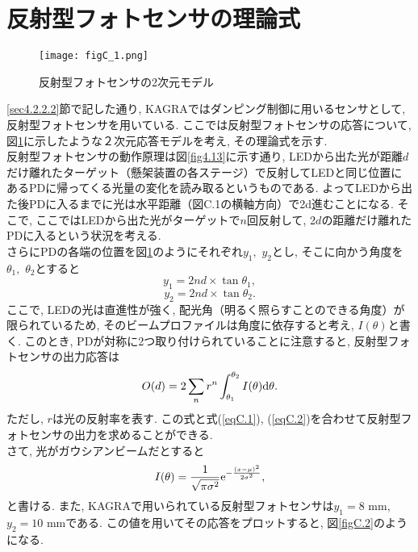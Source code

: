 \section{反射型フォトセンサの理論式}
\begin{figure}[H]
\begin{center}
\texttt{[image: figC\_1.png]}
\caption[反射型フォトセンサの2次元モデル]{反射型フォトセンサの2次元モデル}
\label{figC.1}
\end{center}
\end{figure}
\ref{sec4.2.2.2}節で記した通り, KAGRAではダンピング制御に用いるセンサとして, 反射型フォトセンサを用いている. ここでは反射型フォトセンサの応答について, 図\ref{figC.1}に示したような２次元応答モデルを考え, その理論式を示す. \\
\quad 反射型フォトセンサの動作原理は図\ref{fig4.13}に示す通り, LEDから出た光が距離$d$だけ離れたターゲット（懸架装置の各ステージ）で反射してLEDと同じ位置にあるPDに帰ってくる光量の変化を読み取るというものである. よってLEDから出た後PDに入るまでに光は水平距離（図C.1の横軸方向）で2d進むことになる. そこで, ここではLEDから出た光がターゲットで$n$回反射して, 2$d$の距離だけ離れたPDに入るという状況を考える. \\
\quad さらにPDの各端の位置を図\ref{figC.1}のようにそれぞれ$y_1,\,\,y_2$とし, そこに向かう角度を$\theta_1,\,\,\theta_2$とすると
\begin{equation}
y_1=2nd\times\tan\theta_1,
\label{eqC.1}
\end{equation}
\begin{equation}
y_2=2nd\times\tan\theta_2.
\label{eqC.2}
\end{equation}
ここで, LEDの光は直進性が強く, 配光角（明るく照らすことのできる角度）が限られているため, そのビームプロファイルは角度に依存すると考え, $I(\theta)$と書く. このとき, PDが対称に2つ取り付けられていることに注意すると, 反射型フォトセンサの出力応答は
\begin{equation}
O(d)=2\sum\limits_{n}r^n\int_{\theta_1}^{\theta_2}I(\theta){\rm d}\theta.
\end{equation}
ただし, $r$は光の反射率を表す. この式と式(\ref{eqC.1}), (\ref{eqC.2})を合わせて反射型フォトセンサの出力を求めることができる. \\
\quad さて, 光がガウシアンビームだとすると
\begin{equation}
I(\theta)=\frac{1}{\sqrt{\pi\sigma^2}}{\rm e}^{-\frac{(x-\mu)^2}{2\sigma^2}},
\end{equation}
と書ける. また, KAGRAで用いられている反射型フォトセンサは$y_1=8$ mm, $y_2=10$ mmである\cite{47}. この値を用いてその応答をプロットすると, 図\ref{figC.2}のようになる. \\
